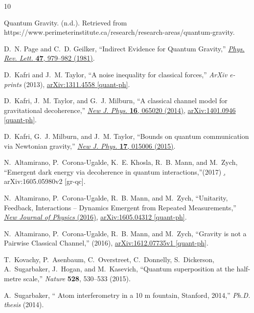 \documentclass[aps, prd, superscriptaddress,twocolumn,amsmath,amssymb,nofootinbib]{revtex4-1}
\begin{document}
\begingroup\raggedright\begin{thebibliography}{10}


Quantum Gravity. (n.d.). Retrieved from https://www.perimeterinstitute.ca/research/research-areas/quantum-gravity.

D.~N. Page and C.~D. Geilker, ``{Indirect Evidence for Quantum Gravity},''
\href{http://dx.doi.org/10.1103/PhysRevLett.47.979}{{\em Phys. Rev. Lett.}
  {\bfseries 47}, 979--982 (1981)}.

D.~{Kafri} and J.~M. {Taylor}, ``{A noise inequality for classical forces},''
  {\em ArXiv e-prints} (2013), \href{http://arxiv.org/abs/1311.4558}{{\ttfamily
  arXiv:1311.4558 [quant-ph]}}.

D.~Kafri, J.~M. Taylor, and G.~J. Milburn, ``{A classical channel model for
  gravitational decoherence},''
  \href{http://dx.doi.org/10.1088/1367-2630/16/6/065020}{{\em New J. Phys.}
  {\bfseries 16}, 065020 (2014)},
\href{http://arxiv.org/abs/1401.0946}{{\ttfamily arXiv:1401.0946 [quant-ph]}}.

D.~Kafri, G.~J. Milburn, and J.~M. Taylor, ``{Bounds on quantum communication
  via Newtonian gravity},''
\href{http://dx.doi.org/10.1088/1367-2630/17/1/015006}{{\em New J. Phys.}
  {\bfseries 17}, 015006 (2015)}.

N.~Altamirano, P.~Corona-Ugalde, K.~E. Khosla, R.~B. Mann, and M.~Zych, ``{Emergent dark energy via decoherence in quantum
interactions},''{(2017)}
   \href{https://arxiv.org/pdf/1605.05980.pdf},
{{\ttfamily arXiv:1605.05980v2 [gr-qc]}}.

N.~Altamirano, P.~Corona-Ugalde, R.~B. Mann, and M.~Zych, ``{Unitarity,
  Feedback, Interactions -- Dynamics Emergent from Repeated Measurements},''
   \href{http://iopscience.iop.org/article/10.1088/1367-2630/aa551b}{{\em New Journal of Physics}
 (2016)},
\href{http://arxiv.org/abs/1605.04312}{{\ttfamily arXiv:1605.04312
  [quant-ph]}}.

N.~Altamirano, P.~Corona-Ugalde, R.~B. Mann, and M.~Zych, ``{Gravity is not a Pairwise Classical Channel},''
   {(2016)},
\href{http://arxiv.org/abs/1612.07735v1}{{\ttfamily arXiv:1612.07735v1
  [quant-ph]}}.

T.~Kovachy, P.~Asenbaum, C.~Overstreet, C.~Donnelly, S.~Dickerson,
  A.~Sugarbaker, J.~Hogan, and M.~Kasevich, ``Quantum superposition at the
  half-metre scale,'' {\em Nature} {\bfseries 528}, 530--533 (2015).

A.~{Sugarbaker}, ``{ Atom interferometry in a 10 m fountain, Stanford, 2014},''
  {\em Ph.D. thesis} (2014).

\end{thebibliography}\endgroup
\end{document}
